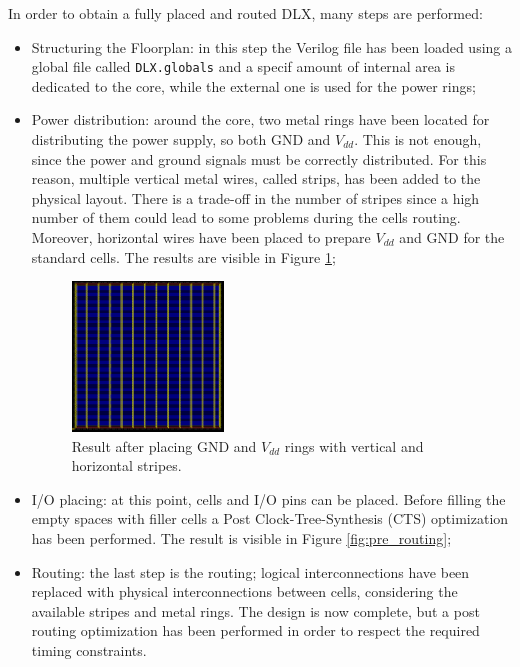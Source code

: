 In order to obtain a fully placed and routed DLX, many steps are performed:
\begin{itemize}
    \item Structuring the Floorplan: in this step the Verilog file has been loaded using a global file called \texttt{DLX.globals} and a specif amount of internal area is dedicated to the core, while the external one is used for the power rings;
    \item Power distribution: around the core, two metal rings have been located for distributing the power supply, so both GND and $V_{dd}$. This is not enough, since the power and ground signals must be correctly distributed. For this reason, multiple vertical metal wires, called strips, has been added to the physical layout. There is a trade-off in the number of stripes since a high number of them could lead to some problems during the cells routing. Moreover, horizontal wires have been placed to prepare $V_{dd}$ and GND for the standard cells. The results are visible in Figure \ref{stripes};
    \begin{figure}[h]   
        \centering
        \includegraphics[width=0.38\textwidth]{chapters/9_PhysicalDesign/images/pwr_distribution.png}
        \caption{Result after placing GND and $V_{dd}$ rings with vertical and horizontal stripes.}
        \label{stripes}
    \end{figure}
    
    \item I/O placing: at this point, cells and I/O pins can be placed. Before filling the empty spaces with filler cells a Post Clock-Tree-Synthesis (CTS) optimization has been performed. The result is visible in Figure \ref{fig:pre_routing};
    \item Routing: the last step is the routing; logical interconnections have been replaced with physical interconnections between cells, considering the available stripes and metal rings. The design is now complete, but a post routing optimization has been performed in order to respect the required timing constraints.
\end{itemize}

